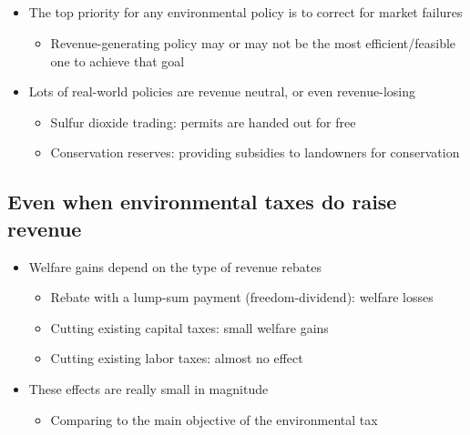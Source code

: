 \documentclass[
]{article}
\providecommand{\tightlist}{%
  \setlength{\itemsep}{0pt}\setlength{\parskip}{0pt}}
\begin{document}
\hypertarget{section-8}{%
\subsection{}\label{section-8}}

\begin{itemize}
\tightlist
\item
  The top priority for any environmental policy is to correct for market
  failures

  \begin{itemize}
  \tightlist
  \item
    Revenue-generating policy may or may not be the most
    efficient/feasible one to achieve that goal
  \end{itemize}
\item
  Lots of real-world policies are revenue neutral, or even
  revenue-losing

  \begin{itemize}
  \tightlist
  \item
    Sulfur dioxide trading: permits are handed out for free
  \item
    Conservation reserves: providing subsidies to landowners for
    conservation
  \end{itemize}
\end{itemize}

\hypertarget{even-when-environmental-taxes-do-raise-revenue}{%
\subsection{Even when environmental taxes do raise
revenue}\label{even-when-environmental-taxes-do-raise-revenue}}

\begin{itemize}
\tightlist
\item
  Welfare gains depend on the type of revenue rebates

  \begin{itemize}
  \tightlist
  \item
    Rebate with a lump-sum payment (freedom-dividend): welfare losses
  \item
    Cutting existing capital taxes: small welfare gains
  \item
    Cutting existing labor taxes: almost no effect
  \end{itemize}
\item
  These effects are really small in magnitude

  \begin{itemize}
  \tightlist
  \item
    Comparing to the main objective of the environmental tax
  \end{itemize}
\end{itemize}
\end{document}
